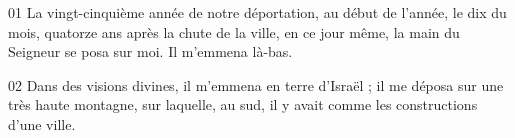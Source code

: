 01 La vingt-cinquième année de notre déportation, au début de l’année, le dix du mois, quatorze ans après la chute de la ville, en ce jour même, la main du Seigneur se posa sur moi. Il m’emmena là-bas.

02 Dans des visions divines, il m’emmena en terre d’Israël ; il me déposa sur une très haute montagne, sur laquelle, au sud, il y avait comme les constructions d’une ville.
